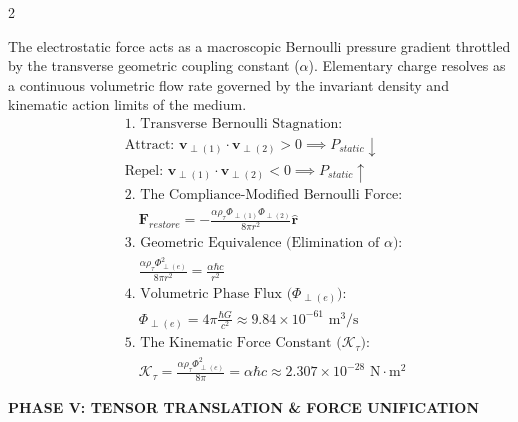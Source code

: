 \begin{multicols}{2}
\begin{tcolorbox}[cheatbox, title={\refstepcounter{cheatnum}\label{box:coulomb_bernoulli}\thecheatnum. Coulomb's Law (Spherical Bernoulli \& Phase Flux) \scriptsize\hfill\hyperref[sec:deriv_coulomb_bernoulli]{[Proof $\downarrow$]}}]
The electrostatic force acts as a macroscopic Bernoulli pressure gradient throttled by the transverse geometric coupling constant ($\alpha$). Elementary charge resolves as a continuous volumetric flow rate governed by the invariant density and kinematic action limits of the medium.
\begin{align}
    &\text{1. Transverse Bernoulli Stagnation:} \nonumber \\
    &\text{Attract:  } \mathbf{v}_{\perp(1)} \cdot \mathbf{v}_{\perp(2)} > 0 \implies P_{static} \downarrow \label{eq:attraction} \\
    &\text{Repel:  } \mathbf{v}_{\perp(1)} \cdot \mathbf{v}_{\perp(2)} < 0 \implies P_{static} \uparrow \label{eq:repulsion} \\
    &\text{2. The Compliance-Modified Bernoulli Force:} \nonumber \\
    &\quad \mathbf{F}_{restore} = - \frac{\alpha \rho_{\tau} \Phi_{\perp(1)} \Phi_{\perp(2)}}{8\pi r^2} \mathbf{\hat{r}} \label{eq:bernoulli_force} \\
    &\text{3. Geometric Equivalence (Elimination of $\alpha$):} \nonumber \\
    &\quad \frac{\alpha \rho_{\tau} \Phi_{\perp(e)}^2}{8\pi r^2} = \frac{\alpha \hbar c}{r^2} \label{eq:force_equivalence} \\
    &\text{4. Volumetric Phase Flux ($\Phi_{\perp(e)}$):} \nonumber \\
    &\quad \Phi_{\perp(e)} = 4\pi \frac{\hbar G}{c^2} \approx 9.84 \times 10^{-61} \text{ m}^3/\text{s} \label{eq:charge_flux_reduced}  \\
    &\text{5. The Kinematic Force Constant ($\mathcal{K}_\tau$):} \nonumber \\
    &\quad \mathcal{K}_\tau = \frac{\alpha \rho_{\tau} \Phi_{\perp(e)}^2}{8\pi} = \alpha \hbar c \approx 2.307 \times 10^{-28} \text{ N}\cdot\text{m}^2 \label{eq:force_constant_reduced}
\end{align}
\end{tcolorbox}


\newpage

\vspace{0.4cm}
\noindent\textbf{\large \color{academiabrown} PHASE V: TENSOR TRANSLATION \& FORCE UNIFICATION}
\vspace{0.2cm}




\end{multicols}
